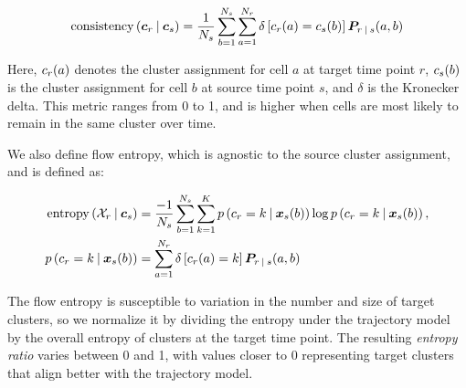 \begin{equation} \label{eq:flow_consistency}
    \operatorname{consistency}\left( \bm{c}_{r} \:\vert\: \bm{c}_{s} \right) = \frac{1}{N_{s}} \sum_{b=1}^{N_{s}} \sum_{a=1}^{N_{r}} \delta\left[c_{r}(a) = c_{s}(b)\right] \bm{P}_{r \:\vert\: s}(a, b)
\end{equation}

Here, $c_{r}(a)$ denotes the cluster assignment for cell $a$ at target time point $r$, $c_{s}(b)$ is the cluster assignment for cell $b$ at source time point $s$, and $\delta$ is the Kronecker delta. This metric ranges from 0 to 1, and is higher when cells are most likely to remain in the same cluster over time.

We also define flow entropy, which is agnostic to the source cluster assignment, and is defined as:

\begin{align}
    \operatorname{entropy}\left( \mathcal{X}_{r} \:\vert\: \bm{c}_{s} \right) &= \frac{-1}{N_{s}} \sum_{b=1}^{N_{s}} \sum_{k=1}^{K} p\left( c_{r} = k \:\vert\: \bm{x}_{s}(b) \right) \operatorname{log} p\left( c_{r} = k \:\vert\: \bm{x}_{s}(b) \right) \label{eq:flow_entropy}, \\
    p\left( c_{r} = k \:\vert\: \bm{x}_{s}(b) \right) &= \sum_{a=1}^{N_{r}} \delta\left[ c_{r}(a) = k \right] \bm{P}_{r \:\vert\: s} (a, b) \nonumber
\end{align}

The flow entropy is susceptible to variation in the number and size of target clusters, so we normalize it by dividing the entropy under the trajectory model by the overall entropy of clusters at the target time point. The resulting \textit{entropy ratio} varies between 0 and 1, with values closer to 0 representing target clusters that align better with the trajectory model.
